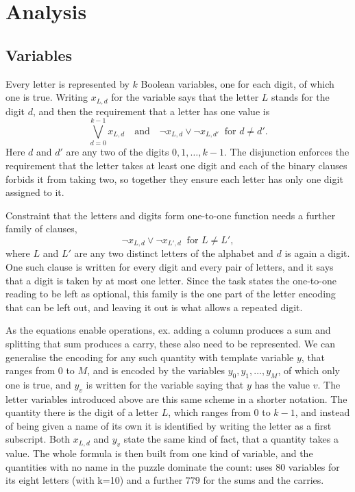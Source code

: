 \documentclass[11pt,a4paper]{article}
\begin{document}
\section{Analysis}

\subsection*{Variables}

Every letter is represented by $k$ Boolean variables, one for each digit, of
which one is true. Writing $x_{L,d}$ for the variable says that the letter
$L$ stands for the digit $d$, and then the requirement that a letter has one value is
\[
  \bigvee_{d=0}^{k-1} x_{L,d}
  \quad\text{and}\quad
  \neg x_{L,d} \vee \neg x_{L,d'} \ \text{ for } d \neq d'.
\]
Here $d$ and $d'$ are any two of the digits $0, 1, \dots, k-1$. The disjunction
enforces the requirement that the letter takes at least one digit and each of the binary clauses
forbids it from taking two, so together they ensure each letter has only one digit assigned to it.

Constraint that the letters and digits form one-to-one function needs a further
family of clauses,
\[
  \neg x_{L,d} \vee \neg x_{L',d} \ \text{ for } L \neq L',
\]
where $L$ and $L'$ are any two distinct letters of the alphabet and $d$ is
again a digit. One such clause is written for every digit and every pair of
letters, and it says that a digit is taken by at most one letter. Since the task states
the one-to-one reading to be left as optional, this family is the one part of the
letter encoding that can be left out, and leaving it out is what allows a repeated digit.

As the equations enable operations, ex. adding a column produces a sum and splitting
that sum produces a carry, these also need to be represented.
We can generalise the encoding for any such quantity with template variable $y$, that ranges from $0$ to $M$, and is
encoded by the variables $y_0, y_1, \dots, y_M$, of which only one is true, and $y_v$ is
written for the variable saying that $y$ has the value $v$. The letter
variables introduced above are this same scheme in a shorter notation. The
quantity there is the digit of a letter $L$, which ranges from $0$ to $k-1$,
and instead of being given a name of its own it is identified by writing the
letter as a first subscript. Both $x_{L,d}$ and $y_v$ state the same
kind of fact, that a quantity takes a value. The whole formula is
then built from one kind of variable, and the quantities with no name in
the puzzle dominate the count:  uses $80$ variables for
its eight letters (with k=10) and a further $779$ for the sums and the carries.
\end{document}

